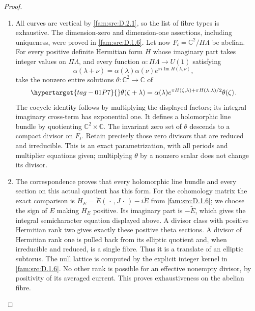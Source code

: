 \begin{proof}
\begin{enumerate}[label=\arabic*.,leftmargin=*]
\item \hypertarget{tag-000H}{}\label{app:rederive:fam-src-D.2.3}
All curves are vertical by \ref{fam:src:D.2.1}, so the list of fibre types is exhaustive.
The dimension-zero and dimension-one assertions, including uniqueness,
were proved in \ref{fam:src:D.1.6}. Let now $F_t=\mathbb C^2/\Pi\Lambda$ be abelian.
For every positive definite Hermitian form $H$ whose imaginary part takes
integer values on $\Pi\Lambda$, and every function
$\alpha:\Pi\Lambda\to U(1)$ satisfying
\[
 \alpha(\lambda+\nu)=\alpha(\lambda)\alpha(\nu)
                 e^{\pi i\operatorname{Im}H(\lambda,\nu)},
\]
take the nonzero entire solutions $\theta:\mathbb C^2\to\mathbb C$ of
\begin{equation}\hypertarget{tag-01P7}{}\label{fam:eq:cd-theta-sections}
 \theta(\zeta+\lambda)=\alpha(\lambda)
 e^{\pi H(\zeta,\lambda)+\pi H(\lambda,\lambda)/2}\theta(\zeta).
\end{equation}
The cocycle identity follows by multiplying the displayed factors; its
integral imaginary cross-term has exponential one. It defines a
holomorphic line bundle by quotienting $\mathbb C^2\times\mathbb C$.
The invariant zero set of $\theta$ descends to a compact divisor on
$F_t$. Retain precisely those zero divisors that are reduced and
irreducible. This is an exact parametrization, with all periods and
multiplier equations given; multiplying $\theta$ by a nonzero scalar
does not change its divisor.

\item The correspondence \cite[Theorem 4.1, p.~1, and equation (4.3), p.~2]{Schnell19} proves
that every holomorphic line bundle and every section on this actual
quotient has this form. For the cohomology matrix the exact comparison is
$H_E=\widetilde E(\,\cdot\,,J\,\cdot\,)-i\widetilde E$ from \ref{fam:src:D.1.6};
we choose the sign of $E$ making $H_E$ positive. Its imaginary part is
$-\widetilde E$, which gives the integral semicharacter equation displayed
above. A divisor class with positive Hermitian rank two gives exactly
these positive theta sections. A divisor of Hermitian rank one is pulled
back from its elliptic quotient and, when irreducible and reduced, is a
single fibre. Thus it is a translate of an elliptic subtorus. The null
lattice is computed by the explicit integer kernel in \ref{fam:src:D.1.6}. No other
rank is possible for an effective nonempty divisor, by positivity of its
averaged current. This proves exhaustiveness on the abelian fibre.


\end{enumerate}
\end{proof}
